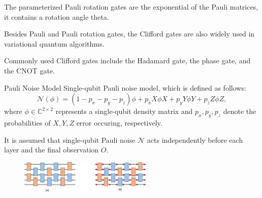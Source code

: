 \documentclass[10pt]{beamer}
\begin{document}
\begin{CJK}{UTF8}{gbsn}
{ The parameterized Pauli rotation gates are the exponential of the Pauli matrices, it contains a rotation angle theta.

 Besides Pauli and Pauli rotation gates, the Clifford gates are also widely used in variational quantum algorithms.

 Commonly used Clifford gates include the Hadamard gate, the phase gate, and the CNOT gate.
}

\begin{frame}[fragile]{Pauli Noise Model}
 Single-qubit Pauli noise model, which is defined as follows:
\begin{equation}\label{eq:single_qubit_noise}
\mathcal{N}(\phi)=(1-p_x-p_y-p_z)\phi+ p_x X\phi X+ p_y Y\phi Y+ p_z Z\phi Z,
\end{equation}
where $\phi\in \mathbb{C}^{2 \times 2}$ represents a single-qubit density matrix and $p_x,p_y,p_z$ denote the probabilities of $X,Y,Z$ error occuring, respectively. 

It is assumed that single-qubit Pauli noise $\mathcal{N}$ acts independently before each layer and the final observation $O$.
\begin{figure}[tbp]
  \includegraphics[width=240px]{fig/Circuit_comb.pdf}
\end{figure}
\end{frame}





\end{CJK}
\end{document}
